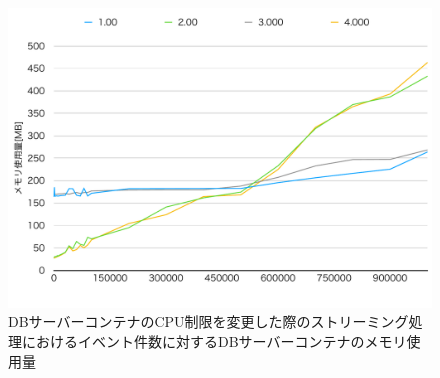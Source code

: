 \documentclass[../../../../../main]{subfiles}
\begin{document}
    \begin{figure}[H]
        \centering
        \includegraphics[width=12cm]{graph}
        \caption{DBサーバーコンテナのCPU制限を変更した際のストリーミング処理におけるイベント件数に対するDBサーバーコンテナのメモリ使用量}
        \label{fig:stream-change-db-cpu-limit-db-memory-app_4_8192-db_1024}
    \end{figure}
\end{document}
